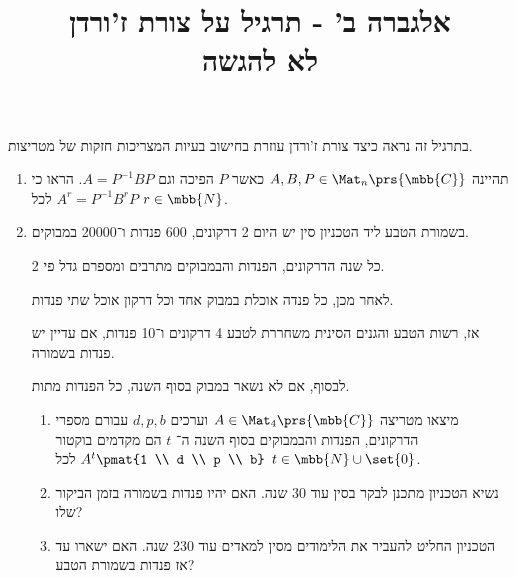 \documentclass[a4paper,10pt,twoside,openany]{article}
\title{
אלגברה ב' - תרגיל על צורת ז'ורדן
\\
\vspace{1cm}
\large{לא להגשה}
}
\date{}
\begin{document}
\maketitle

\begin{exercise}
בתרגיל זה נראה כיצד צורת ז'ורדן עוזרת בחישוב בעיות המצריכות חזקות של מטריצות.

\begin{enumerate}
\item
תהיינה
$A,B,P \in \Mat_n\prs{\mbb{C}}$
כאשר
$P$
הפיכה וגם
$A = P^{-1} B P$.
הראו כי
$A^r = P^{-1} B^r P$
לכל
$r \in \mbb{N}$.

\item
בשמורת הטבע ליד הטכניון סין יש היום 2 דרקונים, 600 פנדות ו־20000 במבוקים.

כל שנה הדרקונים, הפנדות והבמבוקים מתרבים ומספרם גדל פי 2.

לאחר מכן, כל פנדה אוכלת במבוק אחד וכל דרקון אוכל שתי פנדות.

אז, רשות הטבע והגנים הסינית משחררת לטבע 4 דרקונים ו־10 פנדות, אם עדיין יש פנדות בשמורה.

לבסוף, אם לא נשאר במבוק בסוף השנה, כל הפנדות מתות.

\begin{enumerate}
\item
מיצאו מטריצה
$A \in \Mat_4\prs{\mbb{C}}$
וערכים
$d,p,b$
עבורם מספרי הדרקונים, הפנדות והבמבוקים בסוף השנה ה־%
$t$
הם מקדמים בוקטור
$A^t \pmat{1 \\ d \\ p \\ b}$
לכל
$t \in \mbb{N} \cup \set{0}$.

\item נשיא הטכניון מתכנן לבקר בסין עוד 30 שנה. האם יהיו פנדות בשמורה בזמן הביקור שלו?

\item הטכניון החליט להעביר את הלימודים מסין למאדים עוד 230 שנה. האם ישארו עד אז פנדות בשמורת הטבע?
\end{enumerate}
\end{enumerate}
\end{exercise}
\end{document}
